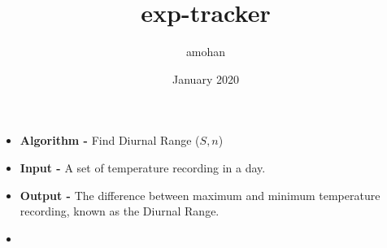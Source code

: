 \documentclass{article}
\title{exp-tracker}
\author{amohan}
\date{January 2020}
\begin{document}
\begin{itemize}
\item[]
\textbf{Algorithm - }Find Diurnal Range ($S, n$)
\item[]
\textbf{Input - }A set of temperature recording in a day.
\item[]
\textbf{Output - }The difference between maximum and minimum temperature recording, known as the Diurnal Range.
\item[]
\scalebox{1}{
\begin{algorithm}[H]
\begin{algorithmic}[1]

\end{algorithmic}
\label{alg:seq}
\end{algorithm}
}
\end{itemize}
\end{document}
